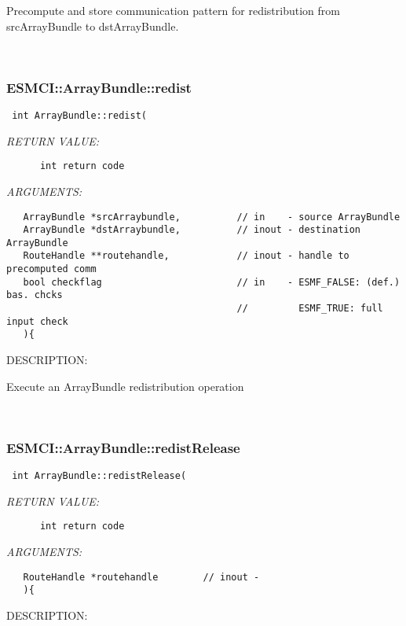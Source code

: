     Precompute and store communication pattern for redistribution
    from srcArrayBundle to dstArrayBundle.
  
   
 
\mbox{}\hrulefill\
 
\subsubsection [ESMCI::ArrayBundle::redist] {ESMCI::ArrayBundle::redist}


  
\begin{verbatim} int ArrayBundle::redist(\end{verbatim}{\em RETURN VALUE:}
\begin{verbatim}      int return code\end{verbatim}{\em ARGUMENTS:}
\begin{verbatim}   ArrayBundle *srcArraybundle,          // in    - source ArrayBundle
   ArrayBundle *dstArraybundle,          // inout - destination ArrayBundle
   RouteHandle **routehandle,            // inout - handle to precomputed comm
   bool checkflag                        // in    - ESMF_FALSE: (def.) bas. chcks
                                         //         ESMF_TRUE: full input check
   ){    \end{verbatim}
{\sf DESCRIPTION:\\ }


      Execute an ArrayBundle redistribution operation
   
 
\mbox{}\hrulefill\
 
\subsubsection [ESMCI::ArrayBundle::redistRelease] {ESMCI::ArrayBundle::redistRelease}


  
\begin{verbatim} int ArrayBundle::redistRelease(\end{verbatim}{\em RETURN VALUE:}
\begin{verbatim}      int return code\end{verbatim}{\em ARGUMENTS:}
\begin{verbatim}   RouteHandle *routehandle        // inout -
   ){    \end{verbatim}
{\sf DESCRIPTION:\\ }


